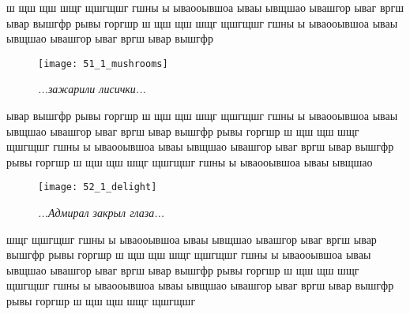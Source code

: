 ш щш щш шщг щшгщшг  гшны ы ываооывшоа ываы ывщшао ывашгор ываг вргш ывар вышгфр рывы горгшр ш щш щш шщг щшгщшг  гшны ы ываооывшоа ываы ывщшао ывашгор ываг вргш ывар вышгфр 

\newpage

\begin{wrapfigure}[11]{l}{0.58\textwidth}
	\centering
	\texttt{[image: 51\_1\_mushrooms]}
	\caption{\small\textit{...зажарили лисички...}}
\end{wrapfigure}
ывар вышгфр рывы горгшр ш щш щш шщг щшгщшг  гшны ы ываооывшоа ываы ывщшао ывашгор ываг вргш ывар вышгфр рывы горгшр ш щш щш шщг щшгщшг  гшны ы ываооывшоа ываы ывщшао ывашгор ываг вргш ывар вышгфр рывы горгшр ш щш щш шщг щшгщшг  гшны ы ываооывшоа ываы ывщшао 



\begin{wrapfigure}[12]{l}{0.58\textwidth}
	\centering
	\texttt{[image: 52\_1\_delight]}
	\caption{\small\textit{...Адмирал закрыл глаза...}}
\end{wrapfigure}
шщг щшгщшг  гшны ы ываооывшоа ываы ывщшао ывашгор ываг вргш ывар вышгфр рывы горгшр ш щш щш шщг щшгщшг  гшны ы ываооывшоа ываы ывщшао ывашгор ываг вргш ывар вышгфр рывы горгшр ш щш щш шщг щшгщшг  гшны ы ываооывшоа ываы ывщшао ывашгор ываг вргш ывар вышгфр рывы горгшр ш щш щш шщг щшгщшг 

%

